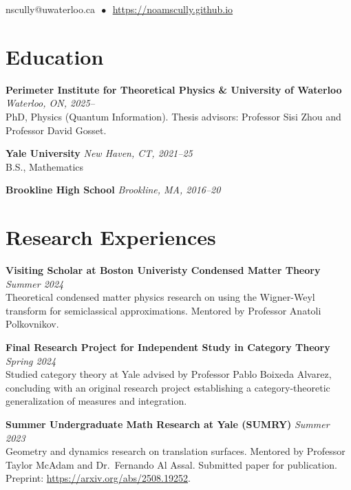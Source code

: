 \documentclass[11pt]{article}
\newcommand{\entry}[3]{
    \vspace{-.58em}
    \textbf{#1} \hfill \textit{#2} \\
    #3 \vspace{0.5em}}
\begin{document}
\begin{center}

  
  \vspace{-.1em}
  \hspace{1.8em}
  nscully@uwaterloo.ca $\, \bullet \,$ \href{https://noamscully.github.io}{https://noamscully.github.io}

\end{center}
\vspace{-0.3em}

\section*{Education}
\vspace{.58em}
\vspace{-0.1em}

\entry{Perimeter Institute for Theoretical Physics \& University of Waterloo}{Waterloo, ON, 2025--}{
PhD, Physics (Quantum Information). Thesis advisors: Professor Sisi Zhou and Professor David Gosset.
}

\entry{Yale University}{New Haven, CT, 2021--25}{
B.S., Mathematics
}

\entry{Brookline High School}{Brookline, MA, 2016--20}{
\vspace{-\baselineskip}
}


\section*{Research Experiences}
\vspace{.58em}
\vspace{-0.1em}

\entry{Visiting Scholar at Boston Univeristy Condensed Matter Theory}{Summer 2024}{
Theoretical condensed matter physics research on using the Wigner-Weyl transform for semiclassical approximations. Mentored by Professor Anatoli Polkovnikov.
}

\entry{Final Research Project for Independent Study in Category Theory}{Spring 2024}{
Studied category theory at Yale advised by Professor Pablo Boixeda Alvarez, concluding with an original research project establishing a category-theoretic generalization of measures and integration. 
}

\entry{Summer Undergraduate Math Research at Yale (SUMRY)}{Summer 2023}{
Geometry and dynamics research on translation surfaces. Mentored by Professor Taylor McAdam and Dr.\ Fernando Al Assal. Submitted paper for publication. Preprint: \href{https://arxiv.org/abs/2508.19252}{https://arxiv.org/abs/2508.19252}.
}
\end{document}
